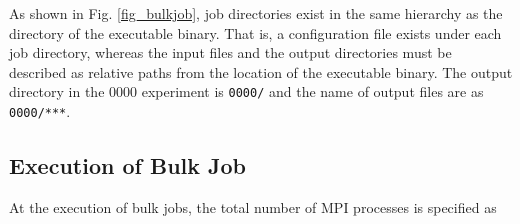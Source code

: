 As shown in Fig. \ref{fig_bulkjob}, job directories exist in the same hierarchy as the directory of the executable binary. That is, a configuration file exists under each job directory, whereas the input files and the output directories must be described as relative paths from the location of  the executable binary. The output directory in the 0000 experiment is \verb|0000/| and the name of output files are as \verb|0000/***|. {\color{blue}{ Note that when the file name is common to all experiments without job directory settings, the output is written to the same file, and the data disappear as a result.
}}




\subsection{Execution of Bulk Job}

At the execution of bulk jobs, the total number of MPI processes is specified as


